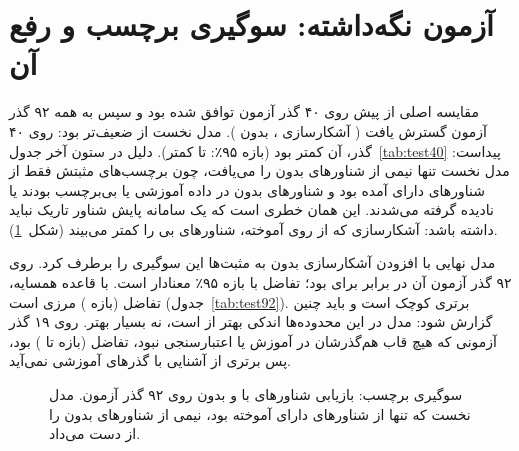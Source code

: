\section{آزمون نگه‌داشته: سوگیری برچسب و رفع آن}
مقایسه اصلی از پیش روی ۴۰ گذر آزمون توافق شده بود و سپس به همه ۹۲ گذر آزمون گسترش یافت
(\testRefs{} آشکارسازی ، \testRefsDark{} بدون ). مدل نخست از  ضعیف‌تر
بود: روی ۴۰ گذر،  آن  کمتر بود (بازه ۹۵٪:  تا 
کمتر). دلیل در ستون آخر جدول~\ref{tab:test40} پیداست: مدل نخست تنها نیمی از شناورهای بدون
 را می‌یافت، چون برچسب‌های مثبتش فقط از شناورهای دارای  آمده بود و
شناورهای بدون  در داده آموزشی یا بی‌برچسب بودند یا نادیده گرفته می‌شدند. این همان
خطری است که یک سامانه پایش شناور تاریک نباید داشته باشد: آشکارسازی که از روی 
آموخته، شناورهای بی‌ را کمتر می‌بیند (شکل~\ref{fig:labelbias}).

مدل نهایی با افزودن \dataTrainDark{} آشکارسازی بدون   به مثبت‌ها این سوگیری را
برطرف کرد. روی ۹۲ گذر آزمون  آن \testFOneModel{} در برابر \testFOneCfar{} برای 
بود؛ تفاضل \testDiff{} با بازه ۹۵٪ \testDiffCi{} معنادار است. با قاعده همسایه، تفاضل
\testDiffNb{} (بازه \testDiffNbCi) مرزی است (جدول~\ref{tab:test92}). برتری کوچک است و
باید چنین گزارش شود: مدل در این محدوده‌ها اندکی بهتر از  است، نه بسیار بهتر. روی
۱۹ گذر آزمونی که هیچ قاب هم‌گذرشان در آموزش یا اعتبارسنجی نبود، تفاضل  (بازه
 تا ) بود، پس برتری از آشنایی با گذرهای آموزشی نمی‌آید.




\begin{figure}[htbp]
\centering
{}
\caption[سوگیری برچسب]{سوگیری برچسب: بازیابی شناورهای با و بدون  روی ۹۲ گذر آزمون. مدل نخست که
تنها از شناورهای دارای  آموخته بود، نیمی از شناورهای بدون  را از دست می‌داد.}
\label{fig:labelbias}
\end{figure}

